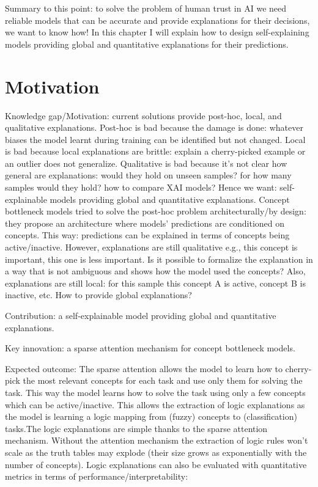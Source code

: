 \documentclass[withindex,glossary]{cam-thesis}
\theoremstyle{plain}
\theoremstyle{definition}
\theoremstyle{remark}
\begin{document}
Summary to this point: to solve the problem of human trust in AI we need reliable models that can be accurate and provide explanations for their decisions, we want to know how! In this chapter I will explain how to design self-explaining models providing global and quantitative explanations for their predictions.

\section{Motivation}

Knowledge gap/Motivation: current solutions provide post-hoc, local, and qualitative explanations. Post-hoc is bad because the damage is done: whatever biases the model learnt during training can be identified but not changed. Local is bad because local explanations are brittle: explain a cherry-picked example or an outlier does not generalize. Qualitative is bad because it's not clear how general are explanations: would they hold on unseen samples? for how many samples would they hold? how to compare XAI models? Hence we want: self-explainable models providing global and quantitative explanations. Concept bottleneck models tried to solve the post-hoc problem architecturally/by design: they propose an architecture where models' predictions are conditioned on concepts. This way: predictions can be explained in terms of concepts being active/inactive. However, explanations are still qualitative e.g., this concept is important, this one is less important. Is it possible to formalize the explanation in a way that is not ambiguous and shows how the model used the concepts? Also, explanations are still local: for this sample this concept A is active, concept B is inactive, etc. How to provide global explanations?

Contribution: a self-explainable model providing global and quantitative explanations.

Key innovation: a sparse attention mechanism for concept bottleneck models.

Expected outcome: The sparse attention allows the model to learn how to cherry-pick the most relevant concepts for each task and use only them for solving the task. This way the model learns how to solve the task using only a few concepts which can be active/inactive. This allows the extraction of logic explanations as the model is learning a logic mapping from (fuzzy) concepts to (classification) tasks.The logic explanations are simple thanks to the sparse attention mechanism. Without the attention mechanism the extraction of logic rules won't scale as the truth tables may explode (their size grows as exponentially with the number of concepts). Logic explanations can also be evaluated with quantitative metrics in terms of performance/interpretability: 
\end{document}
